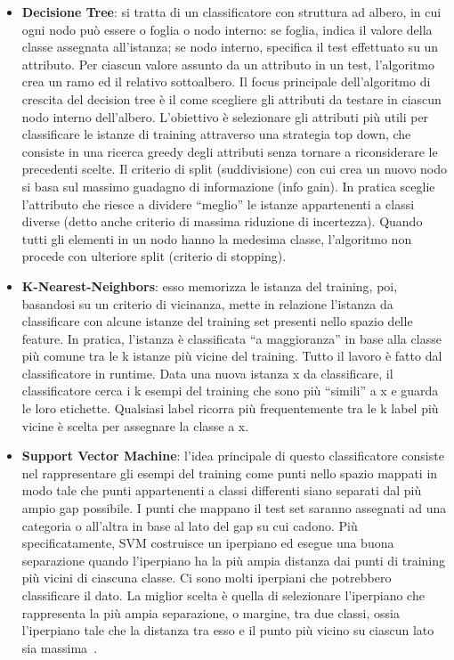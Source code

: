 \begin{itemize}
	\item \textbf{Decisione Tree}: si tratta di un classificatore con struttura ad albero, in cui ogni nodo può essere o foglia o nodo interno: se foglia, indica il valore della classe assegnata all'istanza; se nodo interno, specifica il test effettuato su un attributo. Per ciascun valore assunto da un attributo in un test, l'algoritmo crea un ramo ed il relativo sottoalbero. Il focus principale dell'algoritmo di crescita del decision tree è il come scegliere gli attributi da testare in ciascun nodo interno dell'albero. L'obiettivo è selezionare gli attributi più utili per classificare le istanze di training
	attraverso una strategia top down, che consiste in una ricerca greedy degli
	attributi senza tornare a riconsiderare le precedenti scelte. Il criterio di split (suddivisione) con cui crea un nuovo nodo si basa sul massimo guadagno di informazione (info gain). In pratica sceglie l'attributo che riesce a dividere “meglio” le istanze appartenenti a classi diverse (detto anche criterio di massima riduzione di incertezza). Quando tutti gli elementi in un nodo hanno la medesima classe, l'algoritmo non procede con ulteriore split (criterio di stopping).
	\item \textbf{K-Nearest-Neighbors}: esso memorizza le istanza del training, poi, basandosi su un criterio di vicinanza, mette in relazione l'istanza da classificare con alcune istanze del training set presenti nello spazio delle feature.  In pratica, l'istanza è classificata “a maggioranza” in base alla
	classe più comune tra le k istanze più vicine del training. Tutto il lavoro è fatto dal classificatore in runtime. Data una nuova istanza x da classificare, il classificatore cerca i k esempi del training che sono più “simili” a x e
	guarda le loro etichette. Qualsiasi label ricorra più frequentemente tra le k label più vicine è scelta per assegnare la classe a x.
	\item \textbf{Support Vector Machine}: l'idea principale di questo classificatore consiste nel rappresentare gli esempi del training come punti nello spazio mappati in modo tale che punti appartenenti a classi differenti siano separati dal più ampio gap possibile. I punti che mappano il test set saranno assegnati ad una categoria o all'altra in base al lato del gap su cui cadono. Più specificatamente, SVM costruisce un iperpiano ed esegue una buona separazione quando l'iperpiano ha la più ampia distanza dai punti di training più vicini di ciascuna classe. Ci sono molti iperpiani che potrebbero classificare il dato. La miglior scelta è quella di selezionare l'iperpiano che rappresenta la più ampia separazione, o margine, tra due classi, ossia l'iperpiano tale che la distanza tra esso e il punto più vicino su ciascun lato sia massima~\cite{89}.
\end{itemize}
